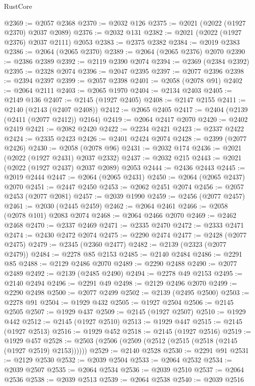 \begin{lexlean}{RustCore}
\begin{coremodule}
@2369 := @2057 @2368
@2370 := @2032 @126
@2375 := @2021 (@2022 (@1927 @2370) @2037 @2089)
@2376 := @2032 @131
@2382 := @2021 (@2022 (@1927 @2376) @2037 @2111) @2053
@2383 := @2375 @2382
@2384 := @2019 @2383
@2386 := @2064 (@2065 @2370)
@2389 := @2064 (@2065 @2376) @2070
@2390 := @2386 @2389
@2392 := @2119 @2390 @2074
@2394 := @2369 (@2384 @2392)
@2395 := @2328 @2074
@2396 := @2047 @2395
@2397 := @2077 @2396
@2398 := @2394 @2397
@2399 := @2057 @2398
@2401 := @2058 (@2078 @91)
@2402 := @2064 @2111
@2403 := @2065 @1970
@2404 := @2134 @2403
@2405 := @2149 @136
@2407 := @2145 (@1927 @2405)
@2408 := @2147 @2155
@2411 := @2140 (@2143 (@2407 @2408))
@2412 := @2065 @2405
@2417 := @2404 (@2139 (@2411 (@2077 @2412)) @2164)
@2419 := @2064 @2417 @2070
@2420 := @2402 @2419
@2421 := @2082 @2420
@2422 := @2234 @2421
@2423 := @2337 @2422
@2424 := @2335 @2423
@2426 := @2401 @2424 @2074
@2428 := @2399 (@2077 @2426)
@2430 := @2058 (@2078 @96)
@2431 := @2032 @174
@2436 := @2021 (@2022 (@1927 @2431) @2037 @2332)
@2437 := @2032 @215
@2443 := @2021 (@2022 (@1927 @2437) @2037 @2089) @2053
@2444 := @2436 @2443
@2445 := @2019 @2444
@2447 := @2064 (@2065 @2431)
@2450 := @2064 (@2065 @2437) @2070
@2451 := @2447 @2450
@2453 := @2062 @2451 @2074
@2456 := @2057 @2453 (@2077 @2081)
@2457 := @2039 @1990
@2459 := @2456 (@2077 @2457)
@2461 := @2030 (@2445 @2459)
@2462 := @2064 @2461
@2466 := @2058 (@2078 @101) @2083 @2074
@2468 := @2064 @2466 @2070
@2469 := @2462 @2468
@2470 := @2337 @2469
@2471 := @2335 @2470
@2472 := @2333 @2471
@2474 := @2430 @2472 @2074
@2475 := @2290 @2474
@2477 := @2428 (@2077 @2475)
@2479 := @2345 (@2360 @2477)
@2482 := @2139 (@2323 (@2077 @2479))
@2484 := @2278 @85 @2153
@2485 := @2140 @2484
@2486 := @2291 @85
@2488 := @2129 @2486 @2070
@2489 := @2290 @2488
@2490 := @2077 @2489
@2492 := @2139 (@2485 @2490)
@2494 := @2278 @49 @2153
@2495 := @2140 @2494
@2496 := @2291 @49
@2498 := @2129 @2496 @2070
@2499 := @2290 @2498
@2500 := @2077 @2499
@2502 := @2139 (@2495 @2500)
@2503 := @2278 @91
@2504 := @1929 @432
@2505 := @1927 @2504
@2506 := @2145 @2505
@2507 := @1929 @437
@2509 := @2145 (@1927 @2507)
@2510 := @1929 @442
@2512 := @2145 (@1927 @2510)
@2513 := @1929 @447
@2515 := @2145 (@1927 @2513)
@2516 := @1929 @452
@2518 := @2145 (@1927 @2516)
@2519 := @1929 @457
@2528 := @2503 (@2506 (@2509 (@2512 (@2515 (@2518 (@2145 (@1927 @2519) @2153))))))
@2529 := @2140 @2528
@2530 := @2291 @91
@2531 := @2129 @2530
@2532 := @2039 @2504
@2533 := @2064 @2532
@2534 := @2039 @2507
@2535 := @2064 @2534
@2536 := @2039 @2510
@2537 := @2064 @2536
@2538 := @2039 @2513
@2539 := @2064 @2538
@2540 := @2039 @2516

\end{coremodule}
\end{lexlean}
